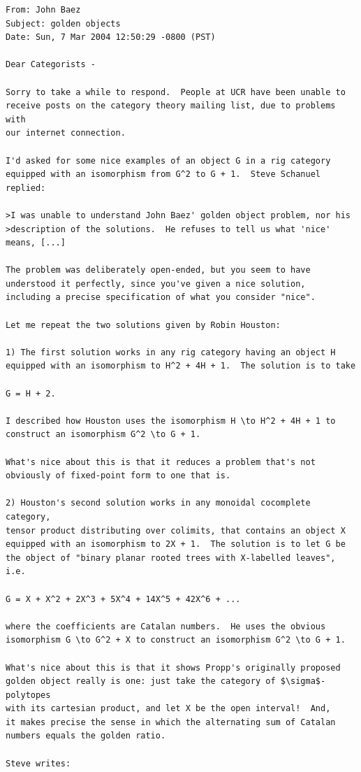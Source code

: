 \documentclass{article}
\begin{document}
\begin{verbatim}
From: John Baez
Subject: golden objects
Date: Sun, 7 Mar 2004 12:50:29 -0800 (PST)

Dear Categorists -

Sorry to take a while to respond.  People at UCR have been unable to
receive posts on the category theory mailing list, due to problems with
our internet connection.  

I'd asked for some nice examples of an object G in a rig category
equipped with an isomorphism from G^2 to G + 1.  Steve Schanuel replied:

>I was unable to understand John Baez' golden object problem, nor his
>description of the solutions.  He refuses to tell us what 'nice' means, [...]

The problem was deliberately open-ended, but you seem to have 
understood it perfectly, since you've given a nice solution, 
including a precise specification of what you consider "nice".  

Let me repeat the two solutions given by Robin Houston:

1) The first solution works in any rig category having an object H 
equipped with an isomorphism to H^2 + 4H + 1.  The solution is to take

G = H + 2.

I described how Houston uses the isomorphism H \to H^2 + 4H + 1 to 
construct an isomorphism G^2 \to G + 1.  

What's nice about this is that it reduces a problem that's not 
obviously of fixed-point form to one that is.

2) Houston's second solution works in any monoidal cocomplete category, 
tensor product distributing over colimits, that contains an object X 
equipped with an isomorphism to 2X + 1.  The solution is to let G be 
the object of "binary planar rooted trees with X-labelled leaves", i.e.

G = X + X^2 + 2X^3 + 5X^4 + 14X^5 + 42X^6 + ...

where the coefficients are Catalan numbers.  He uses the obvious 
isomorphism G \to G^2 + X to construct an isomorphism G^2 \to G + 1.

What's nice about this is that it shows Propp's originally proposed
golden object really is one: just take the category of $\sigma$-polytopes 
with its cartesian product, and let X be the open interval!  And,
it makes precise the sense in which the alternating sum of Catalan
numbers equals the golden ratio.

Steve writes:


\end{verbatim}
\end{document}
